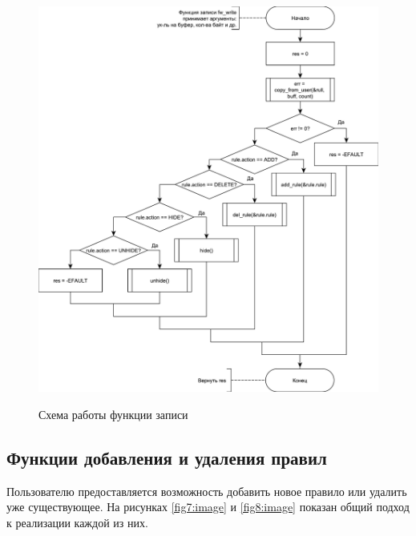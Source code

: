 \begin{figure}[h!]
	\begin{center}
		{\includegraphics[scale = 0.6]{img/write.pdf}}
		\caption{Схема работы функции записи}
		\label{fig6:image}
	\end{center}
\end{figure}

\newpage

\subsection{Функции добавления и удаления правил}
Пользователю предоставляется возможность добавить новое правило или удалить уже существующее. На рисунках \ref{fig7:image} и \ref{fig8:image} показан общий подход к реализации каждой из них.

